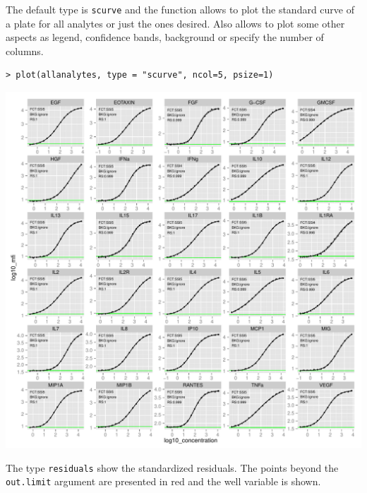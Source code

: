 \documentclass[11pt]{article}\usepackage[]{graphicx}\usepackage[]{color}
\makeatletter
\def\maxwidth{ %
  \ifdim\Gin@nat@width>\linewidth
    \linewidth
  \else
    \Gin@nat@width
  \fi
}
\newenvironment{kframe}{%
 \def\at@end@of@kframe{}%
 \ifinner\ifhmode%
  \def\at@end@of@kframe{\end{minipage}}%
  \begin{minipage}{\columnwidth}%
 \fi\fi%
 \def\FrameCommand##1{\hskip\@totalleftmargin \hskip-\fboxsep
 \colorbox{shadecolor}{##1}\hskip-\fboxsep
     \hskip-\linewidth \hskip-\@totalleftmargin \hskip\columnwidth}%
 \MakeFramed {\advance\hsize-\width
   \@totalleftmargin\z@ \linewidth\hsize
   \@setminipage}}%
 {\par\unskip\endMakeFramed%
 \at@end@of@kframe}
\newenvironment{knitrout}{}{} %
\makeatother
\begin{document}
\noindent The default type is {\tt scurve} and the function 
allows to plot the standard curve of a plate for all analytes 
or just the ones desired. Also allows to plot some other aspects 
as legend, confidence bands, background or specify the number of columns. 


\begin{knitrout}
\color{fgcolor}\begin{kframe}
\begin{verbatim}
> plot(allanalytes, type = "scurve", ncol=5, psize=1)
\end{verbatim}
\end{kframe}

{\centering \includegraphics[width=\maxwidth]{./unnamed-chunk-49-1} 

}



\end{knitrout}

\newpage
\noindent The type {\tt residuals} show the standardized residuals. 
The points beyond the {\tt out.limit} argument are presented in red and 
the well variable is shown.
\end{document}
